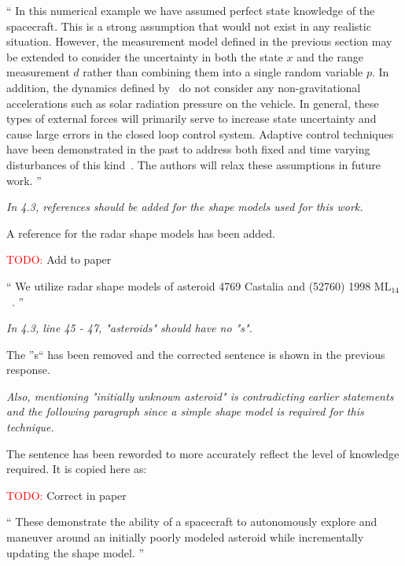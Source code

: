 \documentclass[11pt]{article}
\newcommand{\todo}{{\large \textcolor{red}{TODO: }}}
\newenvironment{correction}{\begin{list}{}{\setlength{\leftmargin}{1cm}\setlength{\rightmargin}{1cm}}\vspace{\parsep}\item[]``}{''\end{list}}
\newcommand{\comment}[1]{\item \itshape #1 \normalfont}
\begin{document}
\begin{itemize}
\begin{correction}
    In this numerical example we have assumed perfect state knowledge of the spacecraft.
    This is a strong assumption that would not exist in any realistic situation. 
    However, the measurement model defined in the previous section may be extended to consider the uncertainty in both the state \( x \) and the range measurement \( d \) rather than combining them into a single random variable \( p \).
    In addition, the dynamics defined by~ do not consider any non-gravitational accelerations such as solar radiation pressure on the vehicle.
    In general, these types of external forces will primarily serve to increase state uncertainty and cause large errors in the closed loop control system.
    Adaptive control techniques have been demonstrated in the past to address both fixed and time varying disturbances of this kind~\cite{kulumani2017a}.
    The authors will relax these assumptions in future work.
\end{correction}

\comment{
In 4.3, references should be added for the shape models used for this work.}

A reference for the radar shape models has been added.

\todo Add to paper

\begin{correction}
We utilize radar shape models of asteroid \num{4769} Castalia and (\num{52760}) \num{1998} \(\text{ML}_{14}\)~\cite{neese2004}.
\end{correction}

\comment{
In 4.3, line 45 - 47, "asteroids" should have no "s". 
}

The ''s`` has been removed and the corrected sentence is shown in the previous response.


\comment{
Also, mentioning "initially unknown asteroid" is contradicting earlier statements and the following paragraph since a simple shape model is required for this technique.
}

The sentence has been reworded to more accurately reflect the level of knowledge required.
It is copied here as:

\todo Correct in paper

\begin{correction}
These demonstrate the ability of a spacecraft to autonomously explore and maneuver around an initially poorly modeled asteroid while incrementally updating the shape model.
\end{correction}


\end{itemize}
\end{document}
